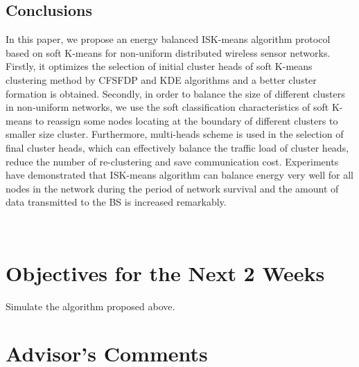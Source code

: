 \documentclass[11pt]{report}
\begin{document}
	\subsection{Conclusions}
	In this paper, we propose an energy balanced ISK-means algorithm protocol based on soft K-means for non-uniform distributed wireless sensor networks.  Firstly, it optimizes the selection of initial cluster heads of soft K-means clustering method by CFSFDP and KDE algorithms and a better cluster formation is obtained. Secondly, in order to balance the size of different clusters in non-uniform networks,  we use the soft classification characteristics of soft K-means to reassign some nodes locating at the boundary of different clusters to smaller size cluster.  Furthermore, multi-heads scheme is used in the selection of final cluster heads, which can effectively balance the traffic load of cluster heads, reduce the number of re-clustering and save communication cost. Experiments have demonstrated that ISK-means algorithm can balance energy very well for all nodes in the network during the period of network survival and the amount of data transmitted to the BS is increased remarkably. 
	
	
	
	
	
	
	
	
	
	~~~~~~~~~~~~~~~~~~~~~~~~~~~~~~~~~~~~~~~~~~~~~~
	
	\section{Objectives for the Next 2 Weeks}
	Simulate the algorithm proposed above.
										
	
	
	\section{Advisor's Comments}
	
	
	
	
\end{document}
